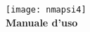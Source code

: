 {
  \centering
  \texttt{[image: nmapsi4]}\\
  \LARGE{\bf\boldmath Manuale d'uso}
  
  
}
\pagebreak 


